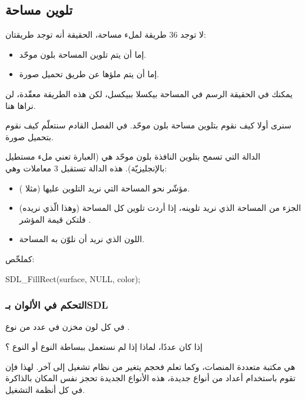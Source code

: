 \subsection{تلوين مساحة}

لا توجد 36 طريقة لملء مساحة، الحقيقة أنه توجد طريقتان:

\begin{itemize}
	\item إما أن يتم تلوين المساحة بلون موحّد.
	\item إما أن يتم ملؤها عن طريق تحميل صورة.
\end{itemize}

\begin{information}
يمكنك في الحقيقة الرسم في المساحة بيكسلا ببيكسل، لكن هذه الطريقة معقّدة، لن نراها هنا.
\end{information}

سنرى أولا كيف نقوم بتلوين مساحة بلون موحّد. في الفصل القادم سنتعلّم كيف نقوم بتحميل صورة.

الدالة التي تسمح بتلوين النافذة بلون موحّد هي
(العبارة 
تعني ملء مستطيل بالإنجليزيّة). هذه الدالة تستقبل 3 معاملات وهي:

\begin{itemize}
	\item مؤشّر نحو المساحة التي نريد التلوين عليها (مثلا
	).
	\item الجزء من المساحة الذي نريد تلوينه، إذا أردت تلوين كل المساحة (وهذا الّذي نريده) فلتكن قيمة المؤشر 
	.
	\item اللون الذي نريد أن نلوّن به المساحة.
\end{itemize}

كملخّص:

\begin{Csource}
SDL_FillRect(surface, NULL, color);
\end{Csource}

\subsubsection{التحكم في الألوان بـ\textenglish{SDL}}

في 
كل لون مخزن في عدد من نوع
.

\begin{question}
إذا كان عددًا، لماذا إذا لم نستعمل ببساطة النوع
أو النوع
؟
\end{question}

هي مكتبة متعددة المنصات، وكما تعلم فحجم 
يتغير من نظام تشغيل إلى آخر. لهذا فإن 
تقوم باستخدام أعداد من أنواع جديدة، هذه الأنواع الجديدة تحجز نفس المكان بالذاكرة في كل أنظمة التشغيل.\\


